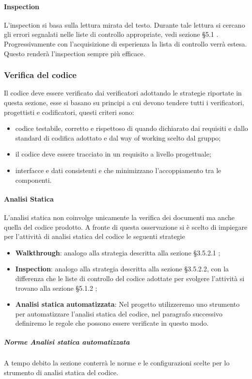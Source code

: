 			\paragraph{Inspection}
				L’inspection si basa sulla lettura mirata del testo. Durante tale lettura si cercano gli errori segnalati nelle liste di controllo appropriate, vedi sezione §5.1 . Progressivamente con l’acquisizione di esperienza la lista di controllo verrà estesa. Questo renderà l’inspection sempre più efficace.

		\subsubsection{Verifica del codice}
			Il codice deve essere verificato dai verificatori adottando le strategie riportate in questa sezione, esse si basano su principi a cui devono tendere tutti i verificatori, progettisti e codificatori, questi criteri sono:
			\begin{itemize}
				\item  codice testabile, corretto e rispettoso di quando dichiarato dai requisiti e dallo standard di codifica adottato e dal way of working scelto dal gruppo;
				\item il codice deve essere tracciato in un requisito a livello progettuale; 
				\item interfacce e dati consistenti e che minimizzano l’accoppiamento tra le componenti.
			\end{itemize}
			\paragraph{Analisi Statica}
				L’analisi statica non coinvolge unicamente la verifica dei documenti ma anche quella del codice prodotto. A fronte di questa osservazione si è scelto di impiegare per l’attività di analisi statica del codice le seguenti strategie
				\begin{itemize}
					\item\textbf{Walkthrough}: analogo alla strategia descritta alla sezione §3.5.2.1 ;
					\item\textbf{Inspection}: analogo alla strategia descritta alla sezione §3.5.2.2, con la differenza che le liste di controllo del codice adottate per svolgere l’attività si trovano alla sezione §5.1.2 ;
					\item\textbf{Analisi statica automatizzata}: Nel progetto utilizzeremo uno strumento per automatizzare l'analisi statica del codice, nel paragrafo successivo definiremo le regole che possono essere verificate in questo modo.
				\end{itemize}
				\subparagraph{Norme Analisi statica automatizzata}
					A tempo debito la sezione conterrà le norme e le configurazioni scelte per lo strumento di analisi statica del codice.
